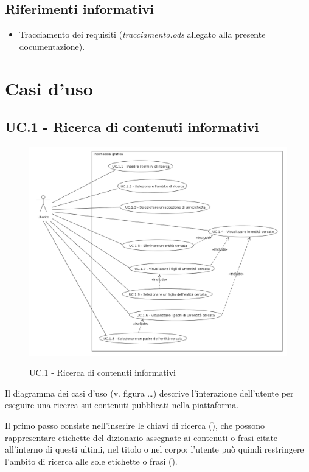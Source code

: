 \documentclass[10pt,a4paper,headinclude,footinclude,hidelinks]{scrreprt} %
\begin{document}
	\section{Riferimenti informativi}
	\label{sec:stage:ar:intro:riferimenti}

	\begin{itemize}
	\item Tracciamento dei requisiti (\textit{tracciamento.ods} allegato alla presente documentazione).
	\end{itemize}

	\chapter{Casi d'uso}
	\label{ch:stage:ar:uc}

	\section{UC.1 - Ricerca di contenuti informativi}
	\label{ch:stage:ar:uc:1}

	\begin{figure}[ht]
		\begin{center}
	    	\includegraphics[width=12cm]{uc_1.png}
			\label{gfx:uc:1}
			\caption{UC.1 - Ricerca di contenuti informativi}
		\end{center}
	\end{figure}

	Il diagramma dei casi d'uso (v. figura \ldots) descrive l'interazione dell'utente per eseguire una ricerca sui contenuti pubblicati nella piattaforma.

	Il primo passo consiste nell'inserire le chiavi di ricerca (), che possono rappresentare etichette del dizionario assegnate ai contenuti o frasi citate all'interno di questi ultimi, nel titolo o nel corpo: l'utente può quindi restringere l'ambito di ricerca alle sole etichette o frasi ().
\end{document}
